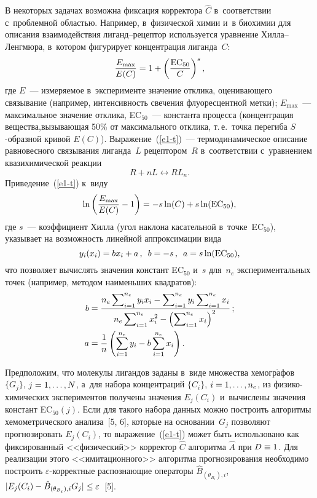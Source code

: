 \begin{multicols}{2}
     В некоторых задачах возможна фиксация корректора $\hat{{C}}$ в~соответствии с~проблемной областью. Например, в~физической химии и~в 
биохимии для описания взаимодействия ли\-ганд--ре\-цеп\-тор используется 
уравнение Хил\-ла--Ленг\-мю\-ра, в~котором фигурирует концентрация 
лиганда~$C$:
     \begin{equation}
     \displaystyle\frac{\displaystyle E_{\max}\mathstrut}{\displaystyle E(C)\mathstrut} =1+\left( \displaystyle\frac{\displaystyle \mathrm{EC}_{50}\mathstrut}{\displaystyle C\mathstrut}\right)^s,
\label{e1-t}
\end{equation}
где $E$~--- измеряемое в~эксперименте значение отклика, оценивающего 
связывание (например, интенсивность свечения флуоресцентной метки);\linebreak 
$E_{\max}$~--- максимальное значение отклика, EC$_{50}$~--- константа 
процесса (концентрация вещества,\linebreak вызывающая 50\% от максимального 
отклика, т.\,е.\ точка перегиба $S$-образ\-ной кривой $E(C)$).
Выражение~(\ref{e1-t})~--- термодинамическое описание равновесного 
связывания лиганда~$L$ рецептором~$R$ в~соответствии с~уравнением 
квазихимической реакции 
$$
R+ nL\leftrightarrow RL_n.
$$
Приведение~(\ref{e1-t}) к~виду
\begin{equation*}
\ln \left( \displaystyle\frac{\displaystyle E_{\max}\mathstrut}{\displaystyle E(C)\mathstrut}-1 \right) = -s \ln(C) +s \ln (\mathrm{EC}_{50}),
\end{equation*}
где
 $s$~--- 
коэффициент Хилла (угол наклона касательной в~точке~EC$_{50}$),  
указывает на возможность линейной аппроксимации вида 
$$
y_i(x_i)= bx_i+a\,,\enskip b= -s\,,\enskip a= s\ln (\mathrm{EC}_{50}),
$$
 что позволяет вычислять 
значения констант EC$_{50}$ и~$s$ для~$n_e$ экспериментальных точек 
(например, методом наименьших квадратов):
\begin{align*}
b&= \displaystyle\frac{\displaystyle n_e\sum\nolimits_{i=1}^{n_e} y_i x_i -\sum\nolimits_{i=1}^{n_e} y_i 
\sum\nolimits_{i=1}^{n_e} x_i\mathstrut}{\displaystyle n_e \sum\nolimits_{i=1}^{n_e} x_i^2 -\left( 
\sum\nolimits_{i=1}^{n_e} x_i\right)^2\mathstrut}\,;\\
a&=\displaystyle\frac{\displaystyle 1\mathstrut}{\displaystyle n\mathstrut}\left( \sum\limits_{i=1}^{n_e} y_i -b\sum\limits_{i=1}^{n_e} 
x_i\right).
\end{align*}
    
Предположим, что молекулы лигандов заданы в~виде множества 
хемогр$\acute{\mbox{а}}$фов $\{G_j\}$, $j\hm= 1,\ldots ,N$, а~для набора 
концентраций $\{C_i\}$, $i\hm= 1,\ldots,n_e$, из фи\-зи\-ко-хи\-ми\-че\-ских 
экспериментов получены значения $E_j(C_i)$ и~вычислены значения констант 
EC$_{50}(j)$. Если для такого набора данных можно построить алгоритмы 
хемометрического анализа~[5, 6], которые на основании~$G_j$ позволяют 
прогнозировать $E_j(C_i)$, то выражение~(\ref{e1-t}) может быть использовано 
как фиксированный <<физический>> корректор $\hat{{C}}$ алгоритма 
$\hat{{A}}$ при ${D}\hm\equiv 1$. Для реализации этого 
<<имитационного>> алгоритма прогнозирования необходимо построить 
$\varepsilon$-кор\-рект\-ные распознающие операторы 
$\hat{{B}}_{(\theta_{B_i}),i}$, $\vert E_j(C_i)\hm- 
\hat{{B}}_{(\theta_{B_i}),i}   G_j \vert \hm\leq \varepsilon$~[5].
     

\end{multicols}
